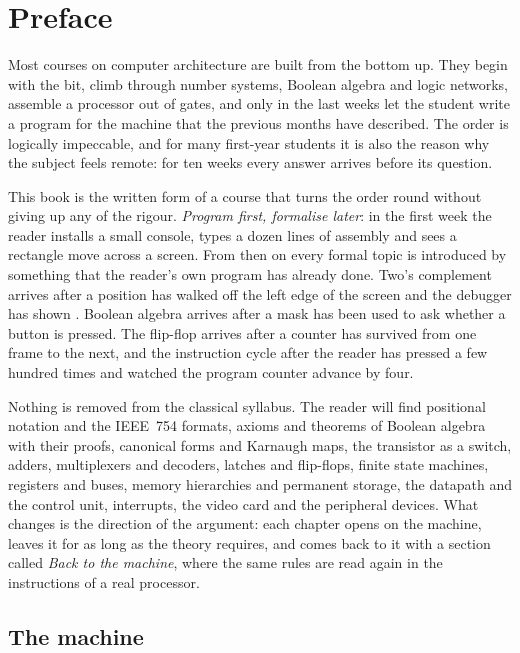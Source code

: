 \chapter{Preface}

Most courses on computer architecture are built from the bottom up. They begin
with the bit, climb through number systems, Boolean algebra and logic networks,
assemble a processor out of gates, and only in the last weeks let the student
write a program for the machine that the previous months have described. The
order is logically impeccable, and for many first-year students it is also the
reason why the subject feels remote: for ten weeks every answer arrives before
its question.

This book is the written form of a course that turns the order round without
giving up any of the rigour. \emph{Program first, formalise later}: in the
first week the reader installs a small console, types a dozen lines of \riscv
assembly and sees a rectangle move across a screen. From then on every formal
topic is introduced by something that the reader's own program has already
done. Two's complement arrives after a position has walked off the left edge
of the screen and the debugger has shown . Boolean algebra
arrives after a mask has been used to ask whether a button is pressed. The
flip-flop arrives after a counter has survived from one frame to the next, and
the instruction cycle after the reader has pressed  a few hundred
times and watched the program counter advance by four.

Nothing is removed from the classical syllabus. The reader will find
positional notation and the IEEE~754 formats, axioms and theorems of Boolean
algebra with their proofs, canonical forms and Karnaugh maps, the transistor as
a switch, adders, multiplexers and decoders, latches and flip-flops, finite
state machines, registers and buses, memory hierarchies and permanent storage,
the datapath and the control unit, interrupts, the video card and the
peripheral devices. What changes is the direction of the argument: each
chapter opens on the machine, leaves it for as long as the theory requires, and
comes back to it with a section called \emph{Back to the machine}, where the
same rules are read again in the instructions of a real processor.

\section*{The machine}

